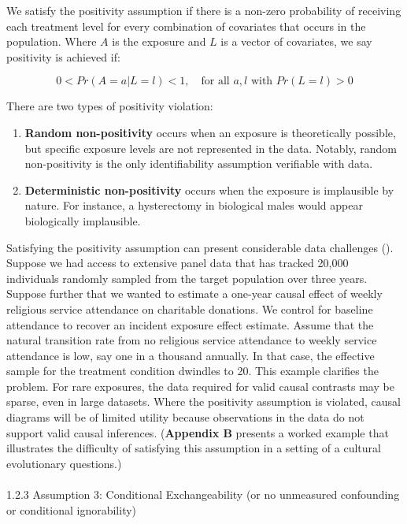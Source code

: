 \documentclass[
  single column]{article}
\makeatletter
\let\oldparagraph\paragraph
\renewcommand{\paragraph}{
    \@ifstar
      \xxxParagraphStar
      \xxxParagraphNoStar
  }
\newcommand{\xxxParagraphStar}[1]{\oldparagraph*{#1}\mbox{}}
\newcommand{\xxxParagraphNoStar}[1]{\oldparagraph{#1}\mbox{}}
\makeatother
\begin{document}
We satisfy the positivity assumption if there is a non-zero probability
of receiving each treatment level for every combination of covariates
that occurs in the population. Where \(A\) is the exposure and \(L\) is
a vector of covariates, we say positivity is achieved if:

\[
0 < Pr(A = a | L = l) < 1, \quad \text{for all } a, l \text{ with } Pr(L = l) > 0
\]

There are two types of positivity violation:

\begin{enumerate}
\def\labelenumi{\arabic{enumi}.}
\item
  \textbf{Random non-positivity} occurs when an exposure is
  theoretically possible, but specific exposure levels are not
  represented in the data. Notably, random non-positivity is the only
  identifiability assumption verifiable with data.
\item
  \textbf{Deterministic non-positivity} occurs when the exposure is
  implausible by nature. For instance, a hysterectomy in biological
  males would appear biologically implausible.
\end{enumerate}

Satisfying the positivity assumption can present considerable data
challenges ().
Suppose we had access to extensive panel data that has tracked 20,000
individuals randomly sampled from the target population over three
years. Suppose further that we wanted to estimate a one-year causal
effect of weekly religious service attendance on charitable donations.
We control for baseline attendance to recover an incident exposure
effect estimate. Assume that the natural transition rate from no
religious service attendance to weekly service attendance is low, say
one in a thousand annually. In that case, the effective sample for the
treatment condition dwindles to 20. This example clarifies the problem.
For rare exposures, the data required for valid causal contrasts may be
sparse, even in large datasets. Where the positivity assumption is
violated, causal diagrams will be of limited utility because
observations in the data do not support valid causal inferences.
(\textbf{Appendix B} presents a worked example that illustrates the
difficulty of satisfying this assumption in a setting of a cultural
evolutionary questions.)

\paragraph{1.2.3 Assumption 3: Conditional Exchangeability (or no
unmeasured confounding or conditional
ignorability)}\label{assumption-3-conditional-exchangeability-or-no-unmeasured-confounding-or-conditional-ignorability}
\end{document}
